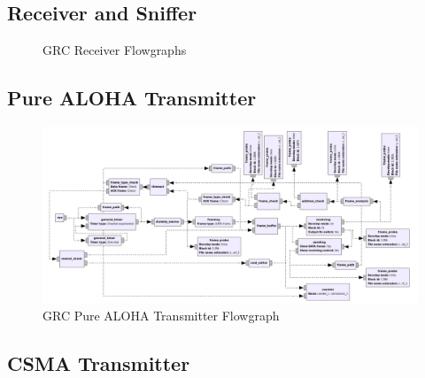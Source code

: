 \subsection{Receiver and Sniffer}

\begin{figure}
	\label{fig:grc-receiver}
	\begin{center}
		\vskip 40pt
	\end{center}
	\caption{GRC Receiver Flowgraphs}
\end{figure}

\subsection{Pure ALOHA Transmitter}

\begin{figure}
	\label{fig:grc-aloha-sender}
	\begin{center}
		\includegraphics[width=\textwidth]{pictures/grc_aloha_transmitter_flowgraph}
\end{center}
\caption{GRC Pure ALOHA Transmitter Flowgraph}
\end{figure}

\subsection{CSMA Transmitter}

